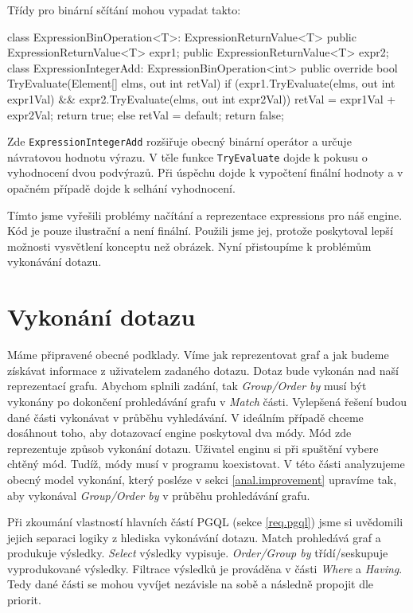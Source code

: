 Třídy pro binární sčítání mohou vypadat takto:
\begin{code}
class ExpressionBinOperation<T>: ExpressionReturnValue<T> {
  public ExpressionReturnValue<T> expr1;
  public ExpressionReturnValue<T> expr2;
}
class ExpressionIntegerAdd: ExpressionBinOperation<int>{
  public override bool TryEvaluate(Element[] elms, out int retVal) {
    if (expr1.TryEvaluate(elms, out int expr1Val) &&
        expr2.TryEvaluate(elms, out int expr2Val)) {
      retVal = expr1Val + expr2Val;
      return true;
    } else {
      retVal = default;
      return false;
    }
  }
}
\end{code}
Zde \texttt{ExpressionIntegerAdd} rozšiřuje obecný binární operátor a určuje návratovou hodnotu výrazu.
V těle funkce \texttt{TryEvaluate} dojde k pokusu o vyhodnocení dvou podvýrazů.
Při úspěchu dojde k vypočtení finální hodnoty a v opačném případě dojde k selhání vyhodnocení. 

Tímto jsme vyřešili problémy načítání a reprezentace expressions pro náš engine.
Kód je pouze ilustrační a není finální.
Použili jsme jej, protože poskytoval lepší možnosti vysvětlení konceptu než obrázek.
Nyní přistoupíme k problémům vykonávání dotazu.

\clearpage

\section{Vykonání dotazu} \label{anal.vykonanidotazu}

Máme připravené obecné podklady.
Víme jak reprezentovat graf a jak budeme získávat informace z uživatelem zadaného dotazu.
Dotaz bude vykonán nad naší reprezentací grafu.
Abychom splnili zadání, tak \textit{Group/Order by} musí být vykonány po dokončení prohledávání grafu v \textit{Match} části.
Vylepšená řešení budou dané části vykonávat v průběhu vyhledávání.
V ideálním případě chceme dosáhnout toho, aby dotazovací engine poskytoval dva módy.
Mód zde reprezentuje způsob vykonání dotazu.
Uživatel enginu si při spuštění vybere chtěný mód.
Tudíž, módy musí v programu koexistovat.
V této části analyzujeme obecný model vykonání, který posléze v sekci \ref{anal.improvement} upravíme tak, aby vykonával \textit{Group/Order by} v průběhu prohledávání grafu.

Při zkoumání vlastností hlavních částí PGQL (sekce \ref{req.pgql}) jsme si uvědomili jejich separaci logiky z hlediska vykonávání dotazu.
Match prohledává graf a produkuje výsledky. 
\textit{Select} výsledky vypisuje. 
\textit{Order/Group by} třídí/seskupuje vyprodukované výsledky.
Filtrace výsledků je prováděna v části \textit{Where} a \textit{Having}.
Tedy dané části se mohou vyvíjet nezávisle na sobě a následně propojit dle priorit.

